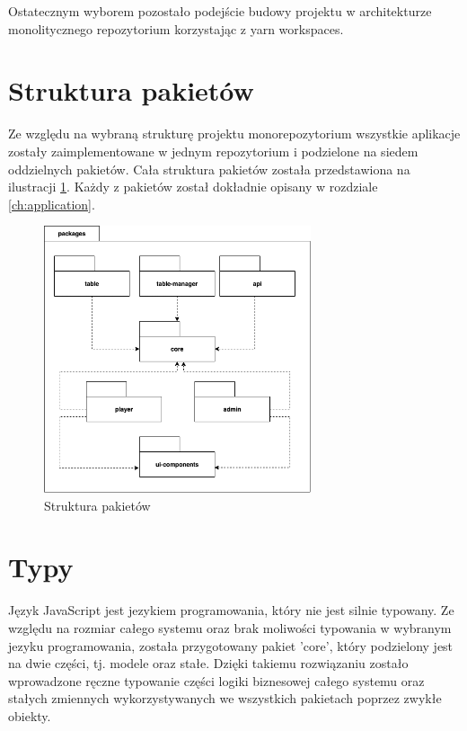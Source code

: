 Ostatecznym wyborem pozostało podejście budowy projektu w architekturze monolitycznego repozytorium korzystając z yarn workspaces.

\newpage

\section{Struktura pakietów}
Ze względu na wybraną strukturę projektu monorepozytorium wszystkie aplikacje zostały zaimplementowane w jednym repozytorium i podzielone na siedem oddzielnych pakietów. Cała struktura pakietów została przedstawiona na ilustracji \ref{fig:packages-structure}. Każdy z pakietów został dokładnie opisany w rozdziale \ref{ch:application}.

\begin{figure}[h!]
  \centering
    \includegraphics[width=0.7\textwidth]{images/diagrams/packages_structure.png}
  \caption{Struktura pakietów}
  \label{fig:packages-structure}
\end{figure}


\section{Typy}
Język JavaScript jest jezykiem programowania, który nie jest silnie typowany. Ze względu na rozmiar całego systemu oraz brak moliwości typowania w wybranym jezyku programowania, została przygotowany pakiet 'core', który podzielony jest na dwie części, tj. modele oraz stałe.
Dzięki takiemu rozwiązaniu zostało wprowadzone ręczne typowanie części logiki biznesowej całego systemu oraz stałych zmiennych wykorzystywanych we wszystkich pakietach poprzez zwykłe obiekty. 


